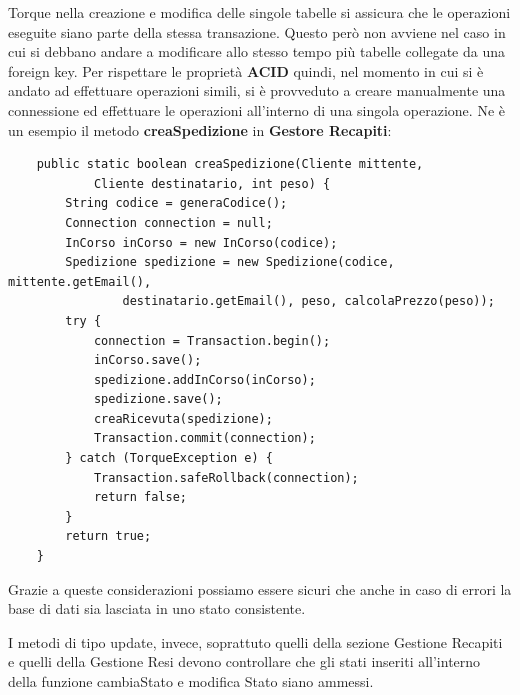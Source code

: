 Torque nella creazione e modifica delle singole tabelle si assicura che le operazioni eseguite siano parte della stessa transazione. Questo però non avviene nel caso in cui si debbano andare a modificare allo stesso tempo più tabelle collegate da una foreign key. Per rispettare le proprietà \textbf{ACID} quindi, nel momento in cui si è andato ad effettuare operazioni simili, si è provveduto a creare manualmente una connessione ed effettuare le operazioni all'interno di una singola operazione. Ne è un esempio il metodo \textbf{creaSpedizione} in \textbf{Gestore Recapiti}:

\begin{verbatim}
    public static boolean creaSpedizione(Cliente mittente, 
            Cliente destinatario, int peso) {
        String codice = generaCodice();
        Connection connection = null;
        InCorso inCorso = new InCorso(codice);
        Spedizione spedizione = new Spedizione(codice, mittente.getEmail(), 
                destinatario.getEmail(), peso, calcolaPrezzo(peso));
        try {
            connection = Transaction.begin();
            inCorso.save();
            spedizione.addInCorso(inCorso);
            spedizione.save();
            creaRicevuta(spedizione);
            Transaction.commit(connection);
        } catch (TorqueException e) {
            Transaction.safeRollback(connection);
            return false;
        }
        return true;
    }
\end{verbatim}

Grazie a queste considerazioni possiamo essere sicuri che anche in caso di errori la base di dati sia lasciata in uno stato consistente.

I metodi di tipo update, invece, soprattuto quelli della sezione Gestione Recapiti e quelli della Gestione Resi devono controllare che gli stati inseriti all'interno della funzione cambiaStato e modifica Stato siano ammessi.
